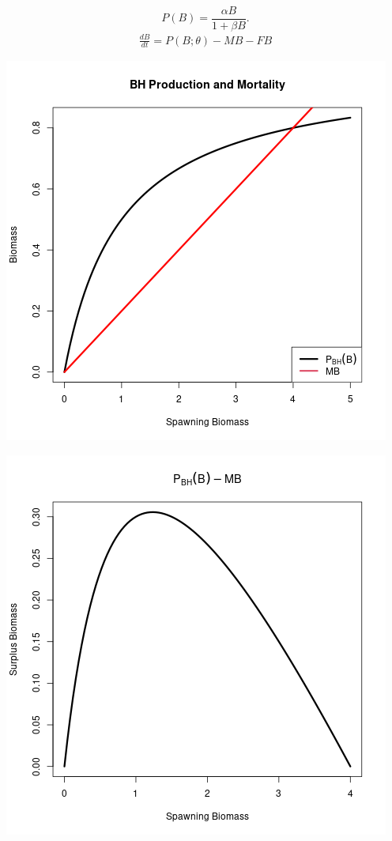 \documentclass[ xcolor = pdftex, dvipsnames, table ]{beamer}
\begin{document}
%
\begin{frame}
\begin{equation}
P(B) = \frac{\alpha B}{1+\beta B}.
\end{equation}
\begin{align}
\frac{dB}{dt} = P(B;\theta) -MB -FB %
\end{align}
\begin{minipage}[h!]{0.49\textwidth}
        \includegraphics[width=\textwidth]{../../gpBias/pBHandM.png}
\end{minipage}
\begin{minipage}[h!]{0.49\textwidth}
        \includegraphics[width=\textwidth]{../../gpBias/yeildBH.png}
\end{minipage}
\end{frame}
\end{document}
